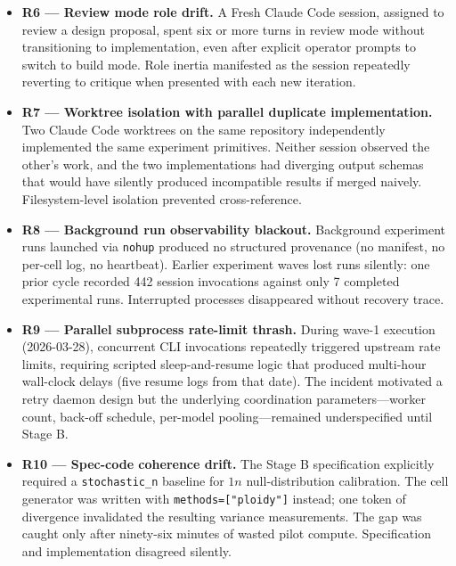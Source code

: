 \documentclass[11pt]{article}
\begin{document}
\begin{itemize}[leftmargin=1.5em]
  \item \textbf{R6 --- Review mode role drift.} A Fresh Claude Code session,
  assigned to review a design proposal, spent six or more turns in review
  mode without transitioning to implementation, even after explicit
  operator prompts to switch to build mode. Role inertia manifested as the
  session repeatedly reverting to critique when presented with each new
  iteration.

  \item \textbf{R7 --- Worktree isolation with parallel duplicate
  implementation.} Two Claude Code worktrees on the same repository
  independently implemented the same experiment primitives. Neither
  session observed the other's work, and the two implementations had
  diverging output schemas that would have silently produced incompatible
  results if merged naively. Filesystem-level isolation prevented
  cross-reference.

  \item \textbf{R8 --- Background run observability blackout.} Background
  experiment runs launched via \texttt{nohup} produced no structured
  provenance (no manifest, no per-cell log, no heartbeat). Earlier
  experiment waves lost runs silently: one prior cycle recorded 442
  session invocations against only 7 completed experimental runs.
  Interrupted processes disappeared without recovery trace.

  \item \textbf{R9 --- Parallel subprocess rate-limit thrash.} During
  wave-1 execution (2026-03-28), concurrent CLI invocations repeatedly
  triggered upstream rate limits, requiring scripted sleep-and-resume
  logic that produced multi-hour wall-clock delays (five resume logs
  from that date). The incident motivated a retry daemon design but the
  underlying coordination parameters---worker count, back-off schedule,
  per-model pooling---remained underspecified until Stage B.

  \item \textbf{R10 --- Spec-code coherence drift.} The Stage B
  specification explicitly required a \texttt{stochastic\_n} baseline for
  $1n$ null-distribution calibration. The cell generator was written with
  \texttt{methods=["ploidy"]} instead; one token of divergence invalidated
  the resulting variance measurements. The gap was caught only after
  ninety-six minutes of wasted pilot compute. Specification and
  implementation disagreed silently.


\end{itemize}
\end{document}
